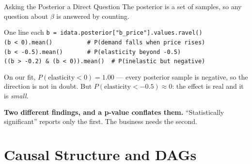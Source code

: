 \documentclass[aspectratio=169, 11pt]{beamer}
\begin{document}
\begin{frame}{Asking the Posterior a Direct Question}
  The posterior is a set of samples, so any question about $\beta$ is answered by counting.

  \begin{examplebox}{One line each}
    {\scriptsize\linespread{1.05}\selectfont
    \texttt{b = idata.posterior["b\_price"].values.ravel()}\\[2pt]
    \texttt{(b < 0).mean()\ \ \ \ \ \ \ \ \ \ \# P(demand falls when price rises)}\\
    \texttt{(b < -0.5).mean()\ \ \ \ \ \ \ \# P(elasticity beyond -0.5)}\\
    \texttt{((b > -0.2) \& (b < 0)).mean()\ \ \# P(inelastic but negative)}
    }
  \end{examplebox}

  On our fit, $P(\text{elasticity} < 0) = \mathbf{1.00}$ --- every posterior sample is negative,
  so the direction is not in doubt. But $P(\text{elasticity} < -0.5) \approx 0$: the effect is
  real and it is \emph{small}.

  \begin{keybox}
    \textbf{Two different findings, and a p-value conflates them.} ``Statistically significant''
    reports only the first. The business needs the second.
  \end{keybox}

\end{frame}

\section{Causal Structure and DAGs}

\end{document}
